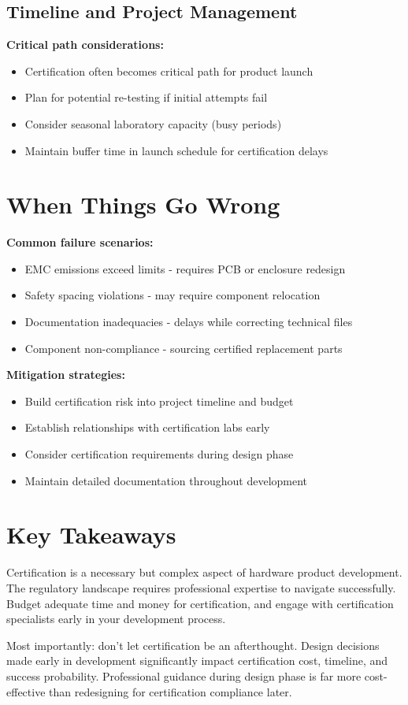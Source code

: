 \subsection{Timeline and Project Management}

\textbf{Critical path considerations:}
\begin{itemize}
\item Certification often becomes critical path for product launch
\item Plan for potential re-testing if initial attempts fail
\item Consider seasonal laboratory capacity (busy periods)
\item Maintain buffer time in launch schedule for certification delays
\end{itemize}

\section{When Things Go Wrong}

\textbf{Common failure scenarios:}
\begin{itemize}
\item EMC emissions exceed limits - requires PCB or enclosure redesign
\item Safety spacing violations - may require component relocation
\item Documentation inadequacies - delays while correcting technical files
\item Component non-compliance - sourcing certified replacement parts
\end{itemize}

\textbf{Mitigation strategies:}
\begin{itemize}
\item Build certification risk into project timeline and budget
\item Establish relationships with certification labs early
\item Consider certification requirements during design phase
\item Maintain detailed documentation throughout development
\end{itemize}

\section{Key Takeaways}

Certification is a necessary but complex aspect of hardware product development. The regulatory landscape requires professional expertise to navigate successfully. Budget adequate time and money for certification, and engage with certification specialists early in your development process.

Most importantly: don't let certification be an afterthought. Design decisions made early in development significantly impact certification cost, timeline, and success probability. Professional guidance during design phase is far more cost-effective than redesigning for certification compliance later.
